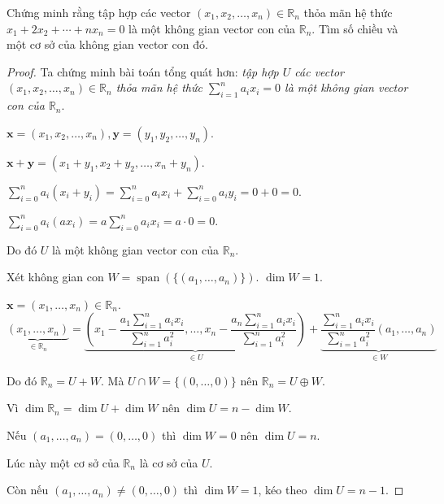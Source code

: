 \begin{exercise}
    Chứng minh rằng tập hợp các vector $(x_{1}, x_{2}, \ldots, x_{n})\in\mathbb{R}_{n}$ thỏa mãn hệ thức $x_{1} + 2x_{2} + \cdots + nx_{n} = 0$ là một không gian vector con của $\mathbb{R}_{n}$. Tìm số chiều và một cơ sở của không gian vector con đó.
\end{exercise}

\begin{proof}
    Ta chứng minh bài toán tổng quát hơn: \textit{tập hợp $U$ các vector $(x_{1}, x_{2}, \ldots, x_{n})\in\mathbb{R}_{n}$ thỏa mãn hệ thức $\displaystyle\sum^{n}_{i=1}a_{i}x_{i} = 0$ là một không gian vector con của $\mathbb{R}_{n}$}.
    
    $\mathbf{x} = (x_{1}, x_{2}, \ldots, x_{n}), \mathbf{y} = (y_{1}, y_{2}, \ldots, y_{n})$.
    
    $\mathbf{x} + \mathbf{y} = (x_{1} + y_{1}, x_{2} + y_{2}, \ldots, x_{n} + y_{n})$.
    
    $\displaystyle\sum^{n}_{i=0}a_{i}(x_{i} + y_{i}) = \displaystyle\sum^{n}_{i=0}a_{i}x_{i} + \displaystyle\sum^{n}_{i=0}a_{i}y_{i} = 0 + 0 = 0$.
    
    $\displaystyle\sum^{n}_{i=0}a_{i}(ax_{i}) = a\displaystyle\sum^{n}_{i=0}a_{i}x_{i} = a\cdot 0 = 0$.
    
    Do đó $U$ là một không gian vector con của $\mathbb{R}_{n}$.
    
    Xét không gian con $W = \operatorname{span}(\{(a_{1},\ldots, a_{n})\})$. $\dim W = 1$.
    
    $\mathbf{x} = (x_{1}, \ldots, x_{n}) \in \mathbb{R}_{n}$.
    \[
        \underbrace{(x_{1},\ldots, x_{n})}_{\in\mathbb{R}_{n}} = \underbrace{\left(x_{1} - \frac{a_{1}\sum^{n}_{i=1} a_{i}x_{i}}{\sum^{n}_{i=1} a^{2}_{i}},\ldots, x_{n} - \frac{a_{n}\sum^{n}_{i=1}a_{i}x_{i}}{\sum^{n}_{i=1}a^{2}_{i}}\right)}_{\in U} + \underbrace{\frac{\sum^{n}_{i=1}a_{i}x_{i}}{\sum^{n}_{i=1}a^{2}_{i}}(a_{1},\ldots,a_{n})}_{\in W}
    \]
    
    Do đó $\mathbb{R}_{n} = U + W$. Mà $U\cap W = \{ (0,\ldots, 0) \}$ nên $\mathbb{R}_{n} = U\oplus W$.
    
    Vì $\dim\mathbb{R}_{n} = \dim U + \dim W$ nên $\dim U = n - \dim W$.
    
    Nếu $(a_{1},\ldots, a_{n}) = (0,\ldots,0)$ thì $\dim W = 0$ nên $\dim U = n$.
    
    Lúc này một cơ sở của $\mathbb{R}_{n}$ là cơ sở của $U$.
    
    Còn nếu $(a_{1},\ldots, a_{n}) \ne (0,\ldots,0)$ thì $\dim W = 1$, kéo theo $\dim U = n - 1$.
    

\end{proof}
